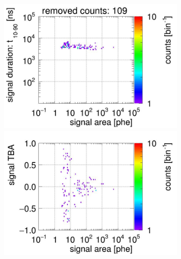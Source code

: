 \begin{landscape}
\begin{figure}[!p]
\begin{subfigure}[t]{0.33\textwidth}
		\includegraphics[width=\figurewidth,clip,trim={0 98 0 10}]{Figures/GasTest/CutsValid/res64767/pdpaX13Vecfig64767.jpg}
		\includegraphics[width=\figurewidth,clip,trim={0 0 0 40}]{Figures/GasTest/CutsValid/res64767/tbapaX13Vecfig64767.jpg}
		\caption{}
		\label{fig:signal selection 13}
	\end{subfigure}
	\begin{subfigure}[t]{0.33\textwidth}
		\centering

\end{subfigure}
\end{figure}
\end{landscape}
